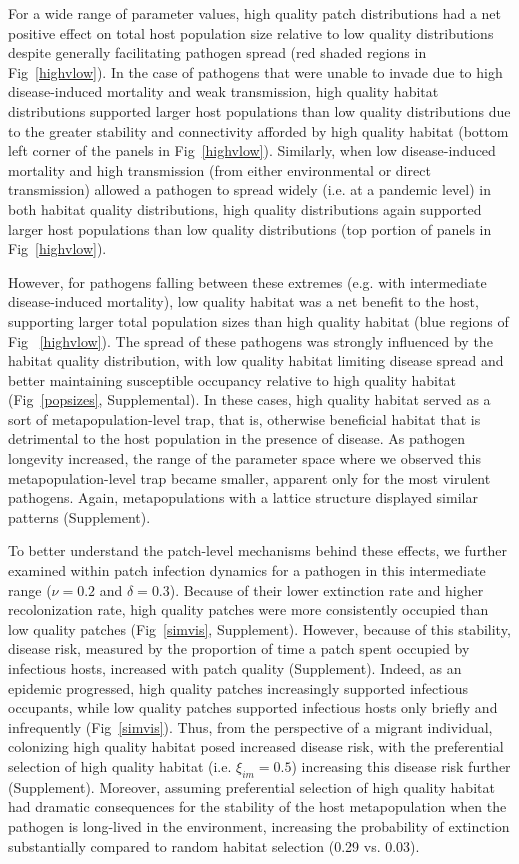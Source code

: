 \documentclass{article}
\begin{document}
For a wide range of parameter values, high quality patch distributions had a net positive effect on total host population size relative to low quality distributions despite generally facilitating pathogen spread (red shaded regions in Fig~\ref{highvlow}).  
In the case of pathogens that were unable to invade due to high disease-induced mortality and weak transmission, high quality habitat distributions supported larger host populations than low quality distributions due to the greater stability and connectivity afforded by high quality habitat (bottom left corner of the panels in Fig~\ref{highvlow}). 
Similarly, when low disease-induced mortality and high transmission (from either environmental or direct transmission) allowed a pathogen to spread widely (i.e. at a pandemic level) in both habitat quality distributions, high quality distributions again supported larger host populations than low quality distributions (top portion of panels in Fig~\ref{highvlow}).

However, for pathogens falling between these extremes (e.g. with intermediate disease-induced mortality), low quality habitat was a net benefit to the host, supporting larger total population sizes than high quality habitat (blue regions of Fig ~\ref{highvlow}).
The spread of these pathogens was strongly influenced by the habitat quality distribution, with low quality habitat limiting disease spread and better maintaining susceptible occupancy relative to high quality habitat (Fig~\ref{popsizes}, Supplemental).
In these cases, high quality habitat served as a sort of metapopulation-level trap, that is, otherwise beneficial habitat that is detrimental to the host population in the presence of disease.
As pathogen longevity increased, the range of the parameter space where we observed this metapopulation-level trap became smaller, apparent only for the most virulent pathogens.
Again, metapopulations with a lattice structure displayed similar patterns (Supplement).

To better understand the patch-level mechanisms behind these effects, we further examined within patch infection dynamics for a pathogen in this intermediate range ($\nu = 0.2$ and $\delta = 0.3$).  
Because of their lower extinction rate and higher recolonization rate, high quality patches were more consistently occupied than low quality patches (Fig~\ref{simvis}, Supplement).  
However, because of this stability, disease risk, measured by the proportion of time a patch spent occupied by infectious hosts, increased with patch quality (Supplement).
Indeed, as an epidemic progressed, high quality patches increasingly supported infectious occupants, while low quality patches supported infectious hosts only briefly and infrequently (Fig~\ref{simvis}).  
Thus, from the perspective of a migrant individual, colonizing high quality habitat posed increased disease risk, with the preferential selection of high quality habitat (i.e. $\xi_{im} = 0.5$) increasing this disease risk further (Supplement).
Moreover, assuming preferential selection of high quality habitat had dramatic consequences for the stability of the host metapopulation when the pathogen is long-lived in the environment, increasing the probability of extinction substantially compared to random habitat selection (0.29 vs. 0.03).
\end{document}
